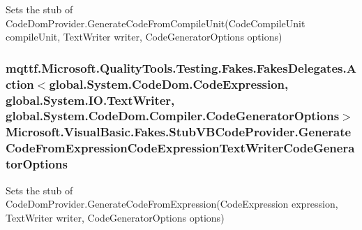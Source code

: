 Sets the stub of Code\-Dom\-Provider.\-Generate\-Code\-From\-Compile\-Unit(\-Code\-Compile\-Unit compile\-Unit, Text\-Writer writer, Code\-Generator\-Options options)

\hypertarget{class_microsoft_1_1_visual_basic_1_1_fakes_1_1_stub_v_b_code_provider_a235365e51c55d47e4d630be64460b9f9}{
\subsubsection[{Generate\-Code\-From\-Expression\-Code\-Expression\-Text\-Writer\-Code\-Generator\-Options}]{\setlength{\rightskip}{0pt plus 5cm}mqttf.\-Microsoft.\-Quality\-Tools.\-Testing.\-Fakes.\-Fakes\-Delegates.\-Action$<$global.\-System.\-Code\-Dom.\-Code\-Expression, global.\-System.\-I\-O.\-Text\-Writer, global.\-System.\-Code\-Dom.\-Compiler.\-Code\-Generator\-Options$>$ Microsoft.\-Visual\-Basic.\-Fakes.\-Stub\-V\-B\-Code\-Provider.\-Generate\-Code\-From\-Expression\-Code\-Expression\-Text\-Writer\-Code\-Generator\-Options}}\label{class_microsoft_1_1_visual_basic_1_1_fakes_1_1_stub_v_b_code_provider_a235365e51c55d47e4d630be64460b9f9}


Sets the stub of Code\-Dom\-Provider.\-Generate\-Code\-From\-Expression(\-Code\-Expression expression, Text\-Writer writer, Code\-Generator\-Options options)

